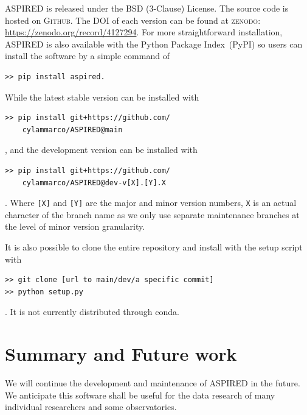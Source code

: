 \documentclass[linenumbers, twocolumn]{aastex631}
\begin{document}
\textsc{ASPIRED} is released under the BSD (3-Clause) License. The source code
is hosted on \textsc{Github}. The DOI of each version can be found at 
\textsc{zenodo}: \url{https://zenodo.org/record/4127294}. For more
straightforward installation, \textsc{ASPIRED} is also available with the
Python Package Index~(PyPI) so users can install the software by a simple
command of 
\begin{verbatim}
>> pip install aspired.
\end{verbatim}
While the latest stable version can be installed with
\begin{verbatim}
>> pip install git+https://github.com/
    cylammarco/ASPIRED@main
\end{verbatim},
and the development version can be installed with 
\begin{verbatim}
>> pip install git+https://github.com/
    cylammarco/ASPIRED@dev-v[X].[Y].X
\end{verbatim}. Where \verb+[X]+ and \verb+[Y]+ are the major and minor
version numbers, \verb+X+ is an actual character of the branch name as we only
use separate maintenance branches at the level of minor version granularity.

It is also possible to clone the entire repository
and install with the setup script with
\begin{verbatim}
>> git clone [url to main/dev/a specific commit]
>> python setup.py
\end{verbatim}
. It is not currently distributed through conda.

\section{Summary and Future work}
\label{sec:summary}

We will continue the development and maintenance of \textsc{ASPIRED} in the
future. We anticipate this software shall be useful for the data research of
many individual researchers and some observatories.
\end{document}
